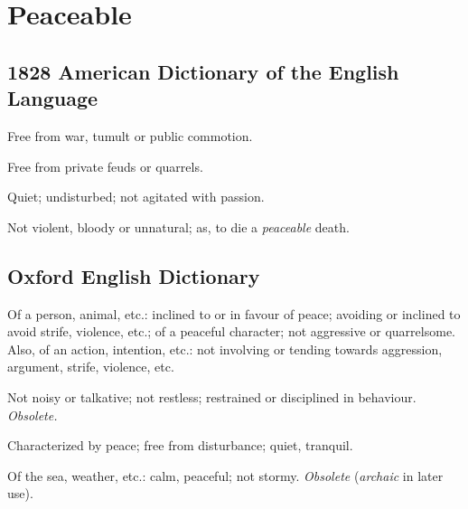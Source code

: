 \section{Peaceable}
	\label{PEACEABLE}
	

\subsection{1828 American Dictionary of the English Language} %
	\label{PEACEABLE-1828}

	\begin{compactitem}
		\item Free from war, tumult or public commotion.
		\item[1] Free from private feuds or quarrels. 
		\item[2] Quiet; undisturbed; not agitated with passion.
		\item[3] Not violent, bloody or unnatural; as, to die a \textit{peaceable} death.
	\end{compactitem}

\subsection{Oxford English Dictionary} %
	\label{PEACEABLE-OED}

	\begin{compactitem}
		\item[1.a] Of a person, animal, etc.: inclined to or in favour of peace; avoiding or inclined to avoid strife, violence, etc.; of a peaceful character; not aggressive or quarrelsome. Also, of an action, intention, etc.: not involving or tending towards aggression, argument, strife, violence, etc.
		\item[1.b] Not noisy or talkative; not restless; restrained or disciplined in behaviour. \textit{Obsolete.}
		\item[2.a] Characterized by peace; free from disturbance; quiet, tranquil.
		\item[2.b] Of the sea, weather, etc.: calm, peaceful; not stormy. \textit{Obsolete} (\textit{archaic} in later use).
	\end{compactitem}
	
